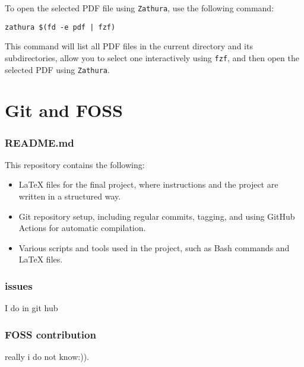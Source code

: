 \documentclass{article}
\begin{document}
To open the selected PDF file using \texttt{Zathura}, use the following command:

\begin{verbatim}
zathura $(fd -e pdf | fzf)
\end{verbatim}
This command will list all PDF files in the current directory and its subdirectories, allow you to select one interactively using \texttt{fzf}, and then open the selected PDF using \texttt{Zathura}.

\section{Git and FOSS}
\subsubsection{README.md}
This repository contains the following:

\begin{itemize}
    \item LaTeX files for the final project, where instructions and the project are written in a structured way.
    \item Git repository setup, including regular commits, tagging, and using GitHub Actions for automatic compilation.
    \item Various scripts and tools used in the project, such as Bash commands and LaTeX files.
\end{itemize}

\subsubsection{issues}
I do in git hub\\

\subsubsection{FOSS contribution}
really i do not know:)).
\end{document}
